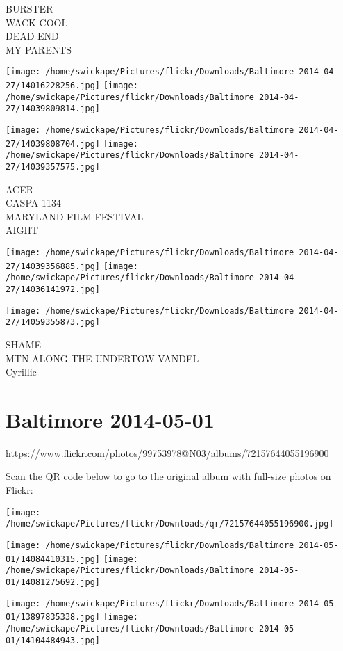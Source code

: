 \documentclass[10pt,letterpaper]{article}
\begin{document}
BURSTER\\
WACK COOL\\
DEAD END\\
MY PARENTS
\pagebreak

\texttt{[image: /home/swickape/Pictures/flickr/Downloads/Baltimore 2014-04-27/14016228256.jpg]}
\texttt{[image: /home/swickape/Pictures/flickr/Downloads/Baltimore 2014-04-27/14039809814.jpg]}

\texttt{[image: /home/swickape/Pictures/flickr/Downloads/Baltimore 2014-04-27/14039808704.jpg]}
\texttt{[image: /home/swickape/Pictures/flickr/Downloads/Baltimore 2014-04-27/14039357575.jpg]}

ACER\\
CASPA 1134\\
MARYLAND FILM FESTIVAL\\
AIGHT
\pagebreak

\texttt{[image: /home/swickape/Pictures/flickr/Downloads/Baltimore 2014-04-27/14039356885.jpg]}
\texttt{[image: /home/swickape/Pictures/flickr/Downloads/Baltimore 2014-04-27/14036141972.jpg]}

\texttt{[image: /home/swickape/Pictures/flickr/Downloads/Baltimore 2014-04-27/14059355873.jpg]}

SHAME\\
MTN ALONG THE UNDERTOW VANDEL\\
Cyrillic
\pagebreak

\section*{Baltimore 2014-05-01}

\url{https://www.flickr.com/photos/99753978@N03/albums/72157644055196900}

Scan the QR code below to go to the original album with full-size photos on Flickr:

\texttt{[image: /home/swickape/Pictures/flickr/Downloads/qr/72157644055196900.jpg]}
\pagebreak

\texttt{[image: /home/swickape/Pictures/flickr/Downloads/Baltimore 2014-05-01/14084410315.jpg]}
\texttt{[image: /home/swickape/Pictures/flickr/Downloads/Baltimore 2014-05-01/14081275692.jpg]}

\texttt{[image: /home/swickape/Pictures/flickr/Downloads/Baltimore 2014-05-01/13897835338.jpg]}
\texttt{[image: /home/swickape/Pictures/flickr/Downloads/Baltimore 2014-05-01/14104484943.jpg]}
\end{document}
